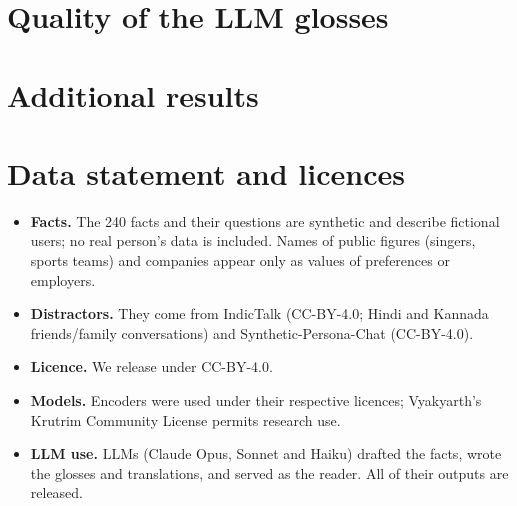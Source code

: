\section{Quality of the LLM glosses}
\label{app:gloss}


\section{Additional results}
\label{app:more}



\section{Data statement and licences}
\label{app:data}
\begin{itemize}
\item \textbf{Facts.} The 240 facts and their questions are synthetic and describe fictional users; no real person's data is included. Names of public figures (singers, sports teams) and companies appear only as values of preferences or employers.
\item \textbf{Distractors.} They come from IndicTalk \citep{gawande2026indictalk} (CC-BY-4.0; Hindi and Kannada friends/family conversations) and Synthetic-Persona-Chat \citep{jandaghi2023syntheticpersonachat} (CC-BY-4.0).
\item \textbf{Licence.} We release \lipi{} under CC-BY-4.0.
\item \textbf{Models.} Encoders were used under their respective licences; Vyakyarth's Krutrim Community License permits research use.
\item \textbf{LLM use.} LLMs (Claude Opus, Sonnet and Haiku) drafted the facts, wrote the glosses and translations, and served as the reader. All of their outputs are released.
\end{itemize}
